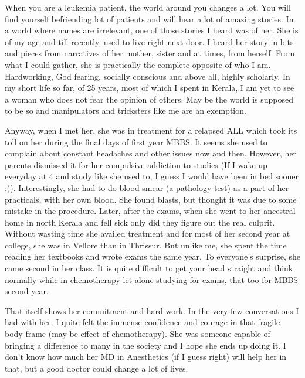 \vskip 2pt

When you are a leukemia patient, the world around you changes a lot. You will find yourself befriending lot of patients and will hear a lot of amazing stories. In a world where names are irrelevant, one of those stories I heard was of her. She is of my age and till recently, used to live right next door. I heard her story in bits and pieces from narratives of her mother, sister and at times, from herself. From what I could gather, she is practically the complete opposite of who I am. Hardworking, God fearing, socially conscious and above all, highly scholarly. In my short life so far, of 25 years, most of which I spent in Kerala, I am yet to see a woman who does not fear the opinion of others. May be the world is supposed to be so and manipulators and tricksters like me are an exemption.

Anyway, when I met her, she was in treatment for a relapsed ALL which took its toll on her during the final days of first year MBBS. It seems she used to complain about constant headaches and other issues now and then. However, her parents dismissed it for her compulsive addiction to studies (If I wake up everyday at 4 and study like she used to, I guess I would have been in bed sooner :)). Interestingly, she had to do blood smear (a pathology test) as a part of her practicals, with her own blood. She found blasts, but thought it was due to some mistake in the procedure. Later, after the exams, when she went to her ancestral home in north Kerala and fell sick only did they figure out the real culprit. Without wasting time she availed treatment and for most of her second year at college, she was in Vellore than in Thrissur. But unlike me, she spent the time reading her textbooks and wrote exams the same year. To everyone's surprise, she came second in her class. It is quite difficult to get your head straight and think normally while in chemotherapy let alone studying for exams, that too for MBBS second year. 

That itself shows her commitment and hard work. In the very few conversations I had with her, I quite felt the immense confidence and courage in that fragile body frame (may be effect of chemotherapy). She was someone capable of bringing a difference to many in the society and I hope she ends up doing it. I don't know how much her MD in Anesthetics (if I guess right) will help her in that, but a good doctor could change a lot of lives. 

